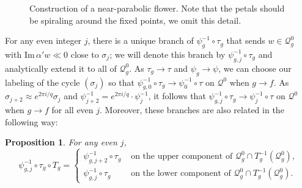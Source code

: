 \documentclass[12pt,letterpaper]{amsart}
\numberwithin{equation}{section}
\newtheorem{prop}[equation]{Proposition}
\theoremstyle{remark}
\theoremstyle{definition}
\newcommand{\QQ}{\mathcal Q}
\begin{document}
	\begin{figure}
		\begin{center}
			\def\svgwidth{5in}
			
			\caption{Construction of a near-parabolic flower. Note that the petals should be spiraling around the fixed points, we omit this detail.}
			\label{petal def fig}
		\end{center}
	\end{figure}
	
	
	For any even integer $j$, there is a unique branch of $\psi_g^{-1}\circ \tau_g$
	that sends  $w\in \QQ_g^{0}$ with $\text{Im}\,\alpha'w\ll 0$ close to $\sigma_j$; we will denote this branch by $\psi_{g, j}^{-1}\circ \tau_g$ and analytically extend it to all of $\QQ_g^{0}$. 
	As $\tau_g\to \tau$ and $\psi_g\to \psi$, we can choose our labeling of the cycle $(\sigma_j)$ so that $\psi_{g, 0}^{-1}\circ \tau_g\to \psi_0^{-1}\circ \tau$ on $\QQ^0$ when $g\to f$.
	As $\sigma_{j+2}\approx e^{2\pi i /q}\sigma_j$ and $\psi_{j+2}^{-1} = e^{2\pi i /q}\cdot \psi_j^{-1}$, it follows that $\psi_{g, j}^{-1}\circ \tau_g\to \psi_j^{-1}\circ \tau$ on $\QQ^0$ when $g\to f$ for all even $j$. 	
	Moreover, these branches are also related in the following way:
	
	\begin{prop}\label{same branch}
		For any even $j$,  
		$$\psi_{g, j}^{-1}\circ \tau_g\circ T_g=\begin{cases}
			\psi_{g, j+2}^{-1}\circ \tau_g&\text{ on the upper component of }\QQ_g^0\cap T_g^{-1}(\QQ_g^0),\\
			\psi_{g, j}^{-1}\circ \tau_g&\text{ on the lower component of }\QQ_g^0\cap T_g^{-1}(\QQ_g^0).
		\end{cases}$$
	\end{prop}
	
\end{document}
